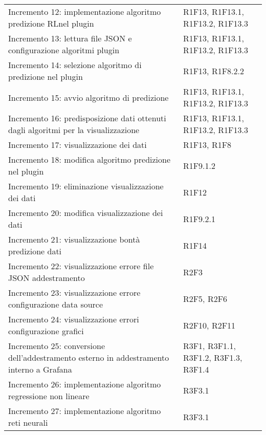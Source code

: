 \begin{longtable} {
		>{}p{85mm}
		>{\raggedleft\arraybackslash}p{40mm}
	}
	Incremento 12: implementazione algoritmo predizione RL\glosp nel plugin &
	R1F13, R1F13.1, R1F13.2, R1F13.3 \TBstrut \\ [2mm]
	
	Incremento 13: lettura file JSON e configurazione algoritmi plugin &
	R1F13, R1F13.1, R1F13.2, R1F13.3 \TBstrut \\ [2mm]
	
	Incremento 14: selezione algoritmo di predizione nel plugin &
	R1F13, R1F8.2.2 \TBstrut \\ [2mm]
	
	Incremento 15: avvio algoritmo di predizione &
	R1F13, R1F13.1, R1F13.2, R1F13.3 \TBstrut \\ [2mm]
	
	Incremento 16: predisposizione dati ottenuti dagli algoritmi per la visualizzazione &
	R1F13, R1F13.1, R1F13.2, R1F13.3 \TBstrut \\ [2mm]
	
	Incremento 17: visualizzazione dei dati &
	R1F13, R1F8 \TBstrut \\ [2mm]
	
	Incremento 18: modifica algoritmo predizione nel plugin &
	R1F9.1.2 \TBstrut \\ [2mm]
	
	Incremento 19: eliminazione visualizzazione dei dati &
	R1F12 \TBstrut \\ [2mm]
	
	Incremento 20: modifica visualizzazione dei dati &
	R1F9.2.1 \TBstrut \\ [2mm]
	
	Incremento 21: visualizzazione bontà predizione dati &
	R1F14 \TBstrut \\ [2mm]
	
	Incremento 22: visualizzazione errore file JSON addestramento &
	R2F3 \TBstrut \\ [2mm]
	
	Incremento 23: visualizzazione errore configurazione data source &
	R2F5, R2F6 \TBstrut \\ [2mm]
	
	Incremento 24: visualizzazione errori configurazione grafici &
	R2F10, R2F11 \TBstrut \\ [2mm]
	
	Incremento 25: conversione dell'addestramento esterno in addestramento interno a Grafana\glosp &
	R3F1, R3F1.1, R3F1.2, R3F1.3, R3F1.4 \TBstrut \\ [2mm]
	
	Incremento 26: implementazione algoritmo regressione non lineare &
	R3F3.1 \TBstrut \\ [2mm]
	
	Incremento 27: implementazione algoritmo reti neurali &
	R3F3.1 \TBstrut \\ [2mm]
	
\end{longtable}
 
